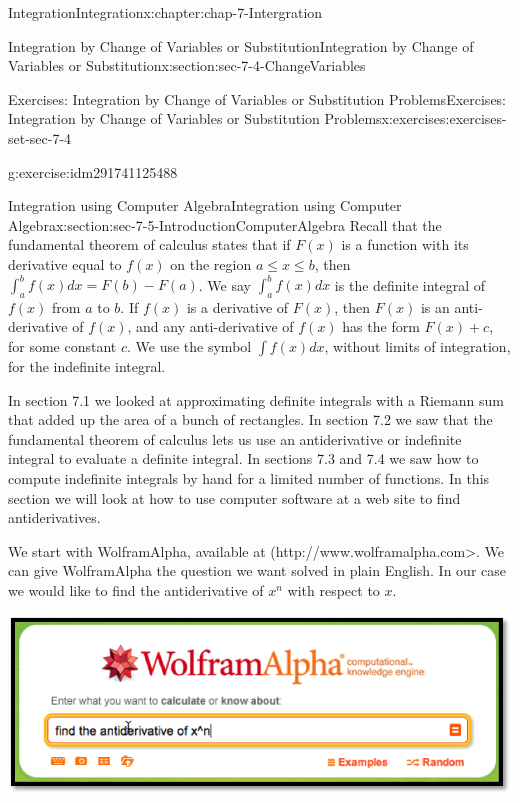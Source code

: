 \documentclass[oneside,10pt,]{book}
\numberwithin{equation}{section}
\begin{document}
\begin{chapterptx}{Integration}{}{Integration}{}{}{x:chapter:chap-7-Intergration}
\begin{sectionptx}{Integration by Change of Variables or Substitution}{}{Integration by Change of Variables or Substitution}{}{}{x:section:sec-7-4-ChangeVariables}
\begin{exercises-subsection}{Exercises: Integration by Change of Variables or Substitution Problems}{}{Exercises: Integration by Change of Variables or Substitution Problems}{}{}{x:exercises:exercises-set-sec-7-4}
\begin{divisionexercise}{24}{}{}{g:exercise:idm291741125488}
\begin{enumerate}[label=(\alph*)]
\end{enumerate}
\end{divisionexercise}%
\end{exercises-subsection}
\end{sectionptx}
%
%
\typeout{************************************************}
\typeout{************************************************}
%
\begin{sectionptx}{Integration using Computer Algebra}{}{Integration using Computer Algebra}{}{}{x:section:sec-7-5-IntroductionComputerAlgebra}
Recall that the fundamental theorem of calculus states that if \(F(x)\) is a function with its derivative equal to \(f(x)\) on the region \(a \le  x \le  b\), then  \(\int_a^b f(x)dx=F(b)-F(a)\).  We say \(\int_a^b f(x)dx\)  is the definite integral of \(f(x)\) from \(a\) to \(b\).  If \(f(x)\) is a derivative of \(F(x)\), then \(F(x)\) is an anti-derivative of \(f(x)\), and any anti-derivative of \(f(x)\) has the form \(F(x) + c\), for some constant \(c\).  We use the symbol  \(\int f(x)dx\), without limits of integration, for the indefinite integral.%
\par
In section 7.1 we looked at approximating definite integrals with a Riemann sum that added up the area of a bunch of rectangles.  In section 7.2 we saw that the fundamental theorem of calculus lets us use an antiderivative or indefinite integral to evaluate a definite integral.  In sections 7.3 and 7.4 we saw how to compute indefinite integrals by hand for a limited number of functions.  In this section we will look at how to use computer software at a web site to find antiderivatives.%
\par
We start with Wolfram\textbar{}Alpha, available at (http:\slash{}\slash{}www.wolframalpha.com\textgreater{}.  We can give Wolfram\textbar{}Alpha the question we want solved in plain English.  In our case we would like to find the antiderivative of \(x^n\) with respect to \(x\).%
\begin{sidebyside}{1}{0.15}{0.15}{0}%
\begin{sbspanel}{0.7}%
\includegraphics[width=\linewidth]{images/sec7-5-1.png}

\end{sbspanel}
\end{sidebyside}
\end{sectionptx}
\end{chapterptx}
\end{document}
